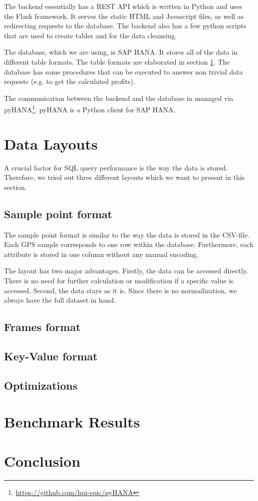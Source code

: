 \documentclass[10pt]{sig-alternate}
\begin{document}
The backend essentially has a REST API which is written in Python and uses the Flask framework. It serves the static HTML and Javascript files, as well as redirecting requests to the database. The backend also has a few python scripts that are used to create tables and for the data cleansing.

The database, which we are using, is SAP HANA. It stores all of the data in different table formats. The table formats are elaborated in section \ref{sec:data_layouts}. The database has some procedures that can be executed to answer non trivial data requests (e.g. to get the calculated profits). 

The communication between the backend and the database in managed via pyHANA\footnote{\href{https://github.com/hpi-epic/pyHANA}{https://github.com/hpi-epic/pyHANA}}. pyHANA is a Python client for SAP HANA.


\section{Data Layouts}
\label{sec:data_layouts}
A crucial factor for SQL query performance is the way the data is stored. Therefore, we tried out three different layouts which we want to present in this section.
\subsection{Sample point format}
The sample point format is similar to the way the data is stored in the CSV-file. Each GPS sample corresponds to one row within the database. Furthermore, each attribute is stored in one column without any manual encoding.

The layout has two major advantages. Firstly, the data can be accessed directly. There is no need for further calculation or modification if a specific value is accessed. Second, the data stays as it is. Since there is no normailization, we always have the full dataset in hand.

\subsection{Frames format}
\subsection{Key-Value format}

\subsection{Optimizations}

\section{Benchmark Results}

\section{Conclusion}

\end{document}
